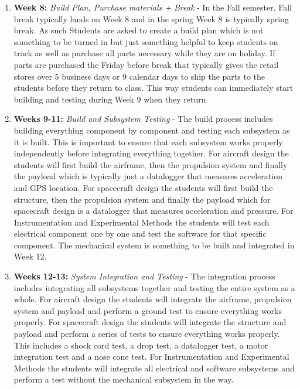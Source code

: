\begin{enumerate}[itemsep=-5pt]
  \item {\bf Week 8:} {\it Build Plan, Purchase materials + Break} - In the Fall semester, Fall break typically lands on Week 8 and in the spring Week 8 is typically spring break. As such Students are asked to create a build plan which is not something to be turned in but just something helpful to keep students on track as well as purchase all parts necessary while they are on holiday. If parts are purchased the Friday before break that typically gives the retail stores over 5 business days or 9 calendar days to ship the parts to the students before they return to class. This way students can immediately start building and testing during Week 9 when they return
  \item {\bf Weeks 9-11:} {\it Build and Subsystem Testing} - The build process includes building everything component by component and testing each subsystem as it is built. This is important to ensure that each subsystem works properly independently before integrating everything together. For aircraft design the students will first build the airframe, then the propulsion system and finally the payload which is typically just a datalogger that measures acceleration and GPS location. For spacecraft design the students will first build the structure, then the propulsion system and finally the payload which for spacecraft design is a datalogger that measures acceleration and pressure. For Instrumentation and Experimental Methods the students will test each electrical component one by one and test the software for that specific component. The mechanical system is something to be built and integrated in Week 12.
  \item {\bf Weeks 12-13:} {\it System Integration and Testing} - The integration process includes integrating all subsystems together and testing the entire system as a whole. For aircraft design the students will integrate the airframe, propulsion system and payload and perform a ground test to ensure everything works properly. For spacecraft design the students will integrate the structure and payload and perform a series of tests to ensure everything works properly. This includes a shock cord test, a drop test, a datalogger test, a motor integration test and a nose cone test. For Instrumentation and Experimental Methods the students will integrate all electrical and software subsystems and perform a test without the mechanical subsystem in the way.

\end{enumerate}
